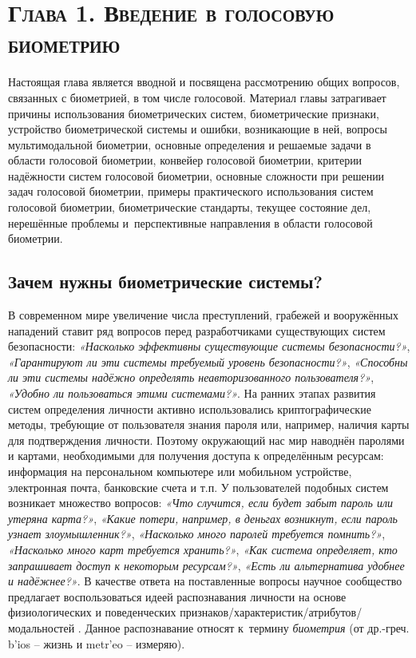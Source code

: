 \documentclass[12pt]{book}
\newcommand{\textgreek}[1]{\begingroup\fontencoding{LGR}\selectfont#1\endgroup}
\begin{document}
\chapter*{\textsc{Глава 1. Введение в голосовую биометрию}}

\thispagestyle{fancy}

\large{Настоящая глава является вводной и посвящена рассмотрению общих вопросов, связанных с биометрией, в том числе голосовой. Материал главы затрагивает причины использования биометрических систем, биометрические признаки, устройство биометрической системы и ошибки, возникающие в ней, вопросы мультимодальной биометрии, основные определения и решаемые задачи в области голосовой биометрии, конвейер голосовой биометрии, критерии надёжности систем голосовой биометрии, основные сложности при решении задач голосовой биометрии, примеры практического использования систем голосовой биометрии, биометрические стандарты, текущее состояние дел, нерешённые проблемы и~перспективные направления в области голосовой биометрии.}

\section{Зачем нужны биометрические системы?}

\large{В современном мире увеличение числа преступлений, грабежей и вооружённых нападений ставит ряд вопросов перед разработчиками существующих систем безопасности: \textit{«Насколько эффективны существующие системы безопасности?»}, \textit{«Гарантируют ли эти системы требуемый уровень безопасности?»}, \textit{«Способны ли эти системы надёжно определять неавторизованного пользователя?»}, \textit{«Удобно ли пользоваться этими системами?»}. На ранних этапах развития систем определения личности активно использовались криптографические методы, требующие от пользователя знания пароля или, например, наличия карты для подтверждения личности. Поэтому окружающий нас мир наводнён паролями и картами, необходимыми для получения доступа к определённым ресурсам: информация на персональном компьютере или мобильном устройстве, электронная почта, банковские счета и т.п. У пользователей подобных систем возникает множество вопросов:  \textit{«Что случится, если будет забыт пароль или утеряна карта?»}, \textit{«Какие потери, например, в деньгах возникнут, если пароль узнает злоумышленник?»}, \textit{«Насколько много паролей требуется помнить?»}, \textit{«Насколько много карт требуется хранить?»}, \textit{«Как система определяет, кто запрашивает доступ к некоторым ресурсам?»}, \textit{«Есть ли альтернатива удобнее и надёжнее?»}. В качестве ответа на поставленные вопросы научное сообщество предлагает воспользоваться идеей распознавания личности на основе физиологических и поведенческих признаков/характеристик/атрибутов/модальностей \cite{unar_2014}. Данное распознавание относят к~термину \textit{биометрия} (от др.-греч. \textgreek{b'ios} -- жизнь и \textgreek{metr'eo} -- измеряю).}
\end{document}
